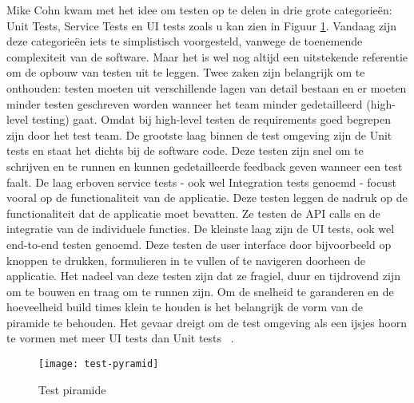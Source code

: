         Mike Cohn kwam met het idee om testen op te delen in drie grote categorieën: Unit Tests, Service Tests en UI tests zoals u kan zien in Figuur \ref{img-test-pyramid}.
        Vandaag zijn deze categorieën iets te simplistisch voorgesteld, vanwege de toenemende complexiteit van de software. Maar het is wel nog altijd een uitstekende referentie om de opbouw van testen uit te leggen.
        Twee zaken zijn belangrijk om te onthouden: testen moeten uit verschillende lagen van detail bestaan en er moeten minder testen geschreven worden wanneer het team minder gedetailleerd (high-level testing) gaat. Omdat bij high-level testen de requirements goed begrepen zijn door het test team.
        De grootste laag binnen de test omgeving zijn de Unit tests en staat het dichts bij de software code. Deze testen zijn snel om te schrijven en te runnen en kunnen gedetailleerde feedback geven wanneer een test faalt.
        De laag erboven service tests - ook wel Integration tests genoemd - focust vooral op de functionaliteit van de applicatie.
        Deze testen leggen de nadruk op de functionaliteit dat de applicatie moet bevatten. Ze testen de API calls en de integratie van de individuele functies.
        De kleinste laag zijn de UI tests, ook wel end-to-end testen genoemd. Deze testen de user interface door bijvoorbeeld op knoppen te drukken, formulieren in te vullen of te navigeren doorheen de applicatie. Het nadeel van deze testen zijn dat ze fragiel, duur en tijdrovend zijn om te bouwen en traag om te runnen zijn.
        Om de snelheid te garanderen en de hoeveelheid build times klein te houden is het belangrijk de vorm van de piramide te behouden. Het gevaar dreigt om de test omgeving als een ijsjes hoorn te vormen met meer UI tests dan Unit tests ~\autocite{Fowler2012}.
        \begin{figure}	
            \texttt{[image: test-pyramid]}
            \caption{Test piramide ~\autocite{Vocke2018}} \label{img-test-pyramid}
        \end{figure}